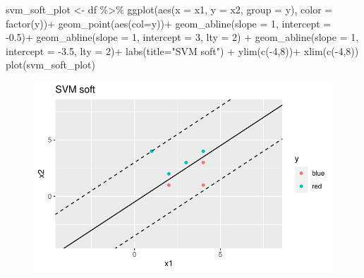 \documentclass[
  letterpaper,
  DIV=11,
  numbers=noendperiod]{scrartcl}
\newenvironment{Shaded}{\begin{snugshade}}{\end{snugshade}}
\newcommand{\AttributeTok}[1]{\textcolor[rgb]{0.40,0.45,0.13}{#1}}
\newcommand{\DecValTok}[1]{\textcolor[rgb]{0.68,0.00,0.00}{#1}}
\newcommand{\FloatTok}[1]{\textcolor[rgb]{0.68,0.00,0.00}{#1}}
\newcommand{\FunctionTok}[1]{\textcolor[rgb]{0.28,0.35,0.67}{#1}}
\newcommand{\NormalTok}[1]{\textcolor[rgb]{0.00,0.23,0.31}{#1}}
\newcommand{\OtherTok}[1]{\textcolor[rgb]{0.00,0.23,0.31}{#1}}
\newcommand{\SpecialCharTok}[1]{\textcolor[rgb]{0.37,0.37,0.37}{#1}}
\newcommand{\StringTok}[1]{\textcolor[rgb]{0.13,0.47,0.30}{#1}}
\begin{document}
\begin{Shaded}
\begin{Highlighting}[]
\NormalTok{svm\_soft\_plot }\OtherTok{\textless{}{-}}\NormalTok{ df }\SpecialCharTok{\%\textgreater{}\%} 
    \FunctionTok{ggplot}\NormalTok{(}\FunctionTok{aes}\NormalTok{(}\AttributeTok{x =}\NormalTok{ x1, }\AttributeTok{y =}\NormalTok{ x2, }\AttributeTok{group =}\NormalTok{ y), }\AttributeTok{color =} \FunctionTok{factor}\NormalTok{(y))}\SpecialCharTok{+}
    \FunctionTok{geom\_point}\NormalTok{(}\FunctionTok{aes}\NormalTok{(}\AttributeTok{col=}\NormalTok{y))}\SpecialCharTok{+}
    \FunctionTok{geom\_abline}\NormalTok{(}\AttributeTok{slope =} \DecValTok{1}\NormalTok{, }\AttributeTok{intercept =} \SpecialCharTok{{-}}\FloatTok{0.5}\NormalTok{)}\SpecialCharTok{+}
    \FunctionTok{geom\_abline}\NormalTok{(}\AttributeTok{slope =} \DecValTok{1}\NormalTok{, }\AttributeTok{intercept =} \DecValTok{3}\NormalTok{, }\AttributeTok{lty =} \DecValTok{2}\NormalTok{) }\SpecialCharTok{+}
    \FunctionTok{geom\_abline}\NormalTok{(}\AttributeTok{slope =} \DecValTok{1}\NormalTok{, }\AttributeTok{intercept =} \SpecialCharTok{{-}}\FloatTok{3.5}\NormalTok{, }\AttributeTok{lty =} \DecValTok{2}\NormalTok{)}\SpecialCharTok{+}
    \FunctionTok{labs}\NormalTok{(}\AttributeTok{title=}\StringTok{"SVM soft"}\NormalTok{) }\SpecialCharTok{+}
    \FunctionTok{ylim}\NormalTok{(}\FunctionTok{c}\NormalTok{(}\SpecialCharTok{{-}}\DecValTok{4}\NormalTok{,}\DecValTok{8}\NormalTok{))}\SpecialCharTok{+}
    \FunctionTok{xlim}\NormalTok{(}\FunctionTok{c}\NormalTok{(}\SpecialCharTok{{-}}\DecValTok{4}\NormalTok{,}\DecValTok{8}\NormalTok{))}
\FunctionTok{plot}\NormalTok{(svm\_soft\_plot)}
\end{Highlighting}
\end{Shaded}

\begin{figure}[H]

{\centering \includegraphics{excercise_doc_files/figure-pdf/unnamed-chunk-26-1.pdf}

}

\end{figure}
\end{document}

